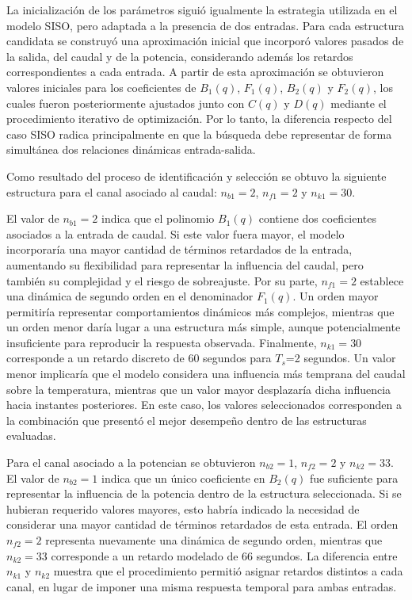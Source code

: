 \documentclass[11pt]{report}
\begin{document}
La inicialización de los parámetros siguió igualmente la estrategia utilizada en el modelo SISO, pero adaptada a la presencia de dos entradas. Para cada estructura candidata se construyó una aproximación inicial que incorporó valores pasados de la salida, del caudal y de la potencia, considerando además los retardos correspondientes a cada entrada. A partir de esta aproximación se obtuvieron valores iniciales para los coeficientes de $B_1(q)$, $F_1(q)$, $B_2(q)$ y $F_2(q)$, los cuales fueron posteriormente ajustados junto con $C(q)$ y $D(q)$ mediante el procedimiento iterativo de optimización. Por lo tanto, la diferencia respecto del caso SISO radica principalmente en que la búsqueda debe representar de forma simultánea dos relaciones dinámicas entrada-salida.

Como resultado del proceso de identificación y selección se obtuvo la siguiente estructura para el canal asociado al caudal: $n_{b1}=2$, $n_{f1}=2$ y $n_{k1}=30$.

El valor de $n_{b1}=2$ indica que el polinomio $B_1(q)$ contiene dos coeficientes asociados a la entrada de caudal. Si este valor fuera mayor, el modelo incorporaría una mayor cantidad de términos retardados de la entrada, aumentando su flexibilidad para representar la influencia del caudal, pero también su complejidad y el riesgo de sobreajuste. Por su parte, $n_{f1}=2$ establece una dinámica de segundo orden en el denominador $F_1(q)$. Un orden mayor permitiría representar comportamientos dinámicos más complejos, mientras que un orden menor daría lugar a una estructura más simple, aunque potencialmente insuficiente para reproducir la respuesta observada. Finalmente, $n_{k1}=30$ corresponde a un retardo discreto de 60 segundos para $T_s$=2 segundos. Un valor menor implicaría que el modelo considera una influencia más temprana del caudal sobre la temperatura, mientras que un valor mayor desplazaría dicha influencia hacia instantes posteriores. En este caso, los valores seleccionados corresponden a la combinación que presentó el mejor desempeño dentro de las estructuras evaluadas.



Para el canal asociado a la potencian se obtuvieron $n_{b2}=1$, $n_{f2}=2$ y $n_{k2}=33$. El valor de $n_{b2}=1$ indica que un único coeficiente en $B_2(q)$ fue suficiente para representar la influencia de la potencia dentro de la estructura seleccionada. Si se hubieran requerido valores mayores, esto habría indicado la necesidad de considerar una mayor cantidad de términos retardados de esta entrada. El orden $n_{f2}=2$ representa nuevamente una dinámica de segundo orden, mientras que $n_{k2}=33$ corresponde a un retardo modelado de 66 segundos. La diferencia entre $n_{k1}$ y $n_{k2}$ muestra que el procedimiento permitió asignar retardos distintos a cada canal, en lugar de imponer una misma respuesta temporal para ambas entradas.
\end{document}
